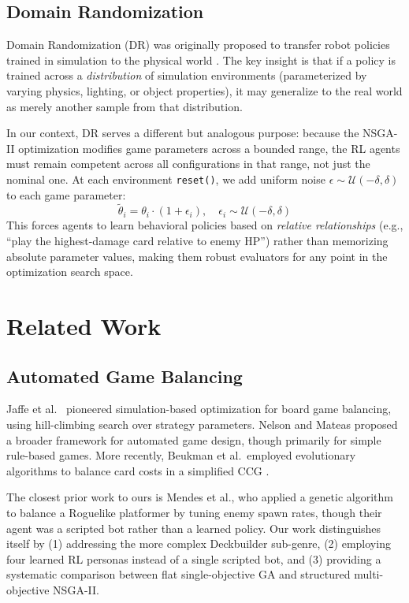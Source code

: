 \subsection{Domain Randomization}

Domain Randomization (DR) was originally proposed to transfer robot policies trained in simulation to the physical world \cite{tobin2017domain}. The key insight is that if a policy is trained across a \textit{distribution} of simulation environments (parameterized by varying physics, lighting, or object properties), it may generalize to the real world as merely another sample from that distribution.

In our context, DR serves a different but analogous purpose: because the NSGA-II optimization modifies game parameters across a bounded range, the RL agents must remain competent across all configurations in that range, not just the nominal one. At each environment \texttt{reset()}, we add uniform noise $\epsilon \sim \mathcal{U}(-\delta, \delta)$ to each game parameter:
\begin{equation}
\tilde{\theta}_i = \theta_i \cdot (1 + \epsilon_i), \quad \epsilon_i \sim \mathcal{U}(-\delta, \delta)
\end{equation}
This forces agents to learn behavioral policies based on \textit{relative relationships} (e.g., ``play the highest-damage card relative to enemy HP'') rather than memorizing absolute parameter values, making them robust evaluators for any point in the optimization search space.

\section{Related Work}

\subsection{Automated Game Balancing}

Jaffe et al.\ \cite{jaffe2012optimizing} pioneered simulation-based optimization for board game balancing, using hill-climbing search over strategy parameters. Nelson and Mateas \cite{nelson2016towards} proposed a broader framework for automated game design, though primarily for simple rule-based games. More recently, Beukman et al.\ employed evolutionary algorithms to balance card costs in a simplified CCG \cite{togelius2011search}.

The closest prior work to ours is Mendes et al., who applied a genetic algorithm to balance a Roguelike platformer by tuning enemy spawn rates, though their agent was a scripted bot rather than a learned policy. Our work distinguishes itself by (1) addressing the more complex Deckbuilder sub-genre, (2) employing four learned RL personas instead of a single scripted bot, and (3) providing a systematic comparison between flat single-objective GA and structured multi-objective NSGA-II.

